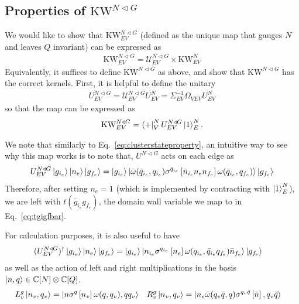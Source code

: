 \documentclass[nofootinbib,prx,twocolumn,showpacs,superscriptaddress,notitlepage,amsmath,amssymb]{revtex4-2}
\theoremstyle{definition}
\def\KW{\text{KW}}
\def\aut#1#2{\sigma^{#1} \left [ {#2} \right]}
\def\bra#1{\mathinner{\langle{#1}|}}
\def\ket#1{\mathinner{|{#1}\rangle}}
\def\CC{\mathbb C}
\begin{document}
\subsection{Properties of $\KW^{N\triangleleft G}$}\label{app:KWN}

We would like to show that $\KW^{N \triangleleft G}_{EV}$ (defined as the unique map that gauges $N$ and leaves $Q$ invariant) can be expressed as
\begin{align}
   \KW^{N \triangleleft G}_{EV} =\mathcal U^{N \triangleleft G}_{EV} \times \KW^N_{EV}
\end{align}
Equivalently, it suffices to define $\KW^{N \triangleleft G}$ as above, and show that $\KW^{N \triangleleft G}$ has the correct kernels.  First, it is helpful to define the unitary
\begin{align}
   U^{N \triangleleft G}_{EV} = \mathcal U^{N \triangleleft G}_{EV} U^N_{EV} =\Sigma_{EV}^{-1} \Omega_{VEV} U^N_{EV}
\end{align}
so that the map can be expressed as
\begin{align}
   \KW^{N \triangleleft G}_{EV} = \bra{+}^N_V U_{EV}^{N \triangleleft G} \ket{1}^N_E.
\end{align}


We note that similarly to Eq.~\eqref{eq:clusterstateproperty}, an intuitive way to see why this map works is to note that, $U^{N \triangleleft G} $ acts on each edge as
\begin{align}
U^{N \triangleleft G}_{EV} \ket{g_{i_e}}\ket{n_e}\ket{g_{f_e}}=\ket{g_{i_e}}\ket{\bar \omega(\bar q_{i_e},q_{i_e}) \aut{\bar q_{i_e}}{\bar n_{i_e}n_e n_{f_e}}\omega(\bar q_{i_e},q_{f_e})}\ket{g_{f_e}}
\end{align}
Therefore, after setting $n_e=1$ (which is implemented by contracting with $\ket{1}^N_E$), we are left with $t(\bar g_{i_e}g_{f_e})$, the domain wall variable we map to in Eq.~\eqref{eq:tgigfbar}.

For calculation purposes, it is also useful to have
\begin{align}
(U^{N \triangleleft G}_{EV})^\dagger \ket{g_{i_e}}\ket{n_e}\ket{g_{f_e}}   &=\ket{g_{i_e}}\ket{n_{i_e} \aut{q_{i_e}}{n_e}\omega(q_{i_e},\bar q_{i_e}q_{f_e}) \bar n_{f_e}}\ket{g_{f_e}}   
\end{align}
as well as the action of left and right multiplications in the basis $\ket{n,q} \in \CC[N]\otimes \CC[Q]$.
\begin{align}
  L^g_v \ket{n_v,q_v} &=   \ket{n\aut{q}{n_v}\omega(q,q_v),qq_v} & R^g_v \ket{n_v,q_v} &=   \ket{n_e\bar \omega(q_v\bar q,q)\aut{q_v\bar q}{\bar n},q_v\bar q}
\end{align}
\end{document}
